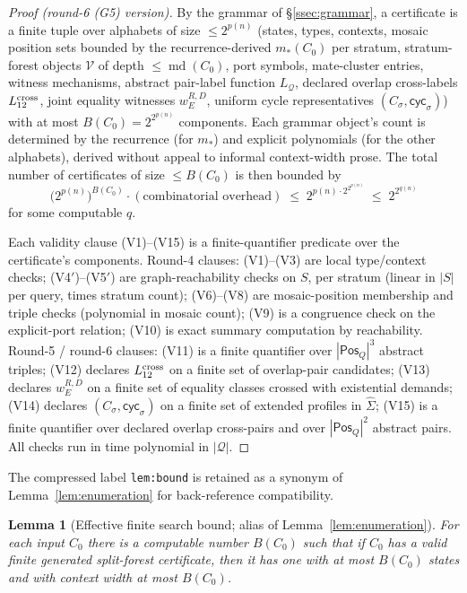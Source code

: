 \documentclass[11pt]{article}
\newtheorem{lemma}[theorem]{Lemma}
\newcommand{\Q}{\mathcal Q}
\newcommand{\Pos}{\mathsf{Pos}}
\newcommand{\extSigma}{\widehat\Sigma}
\newcommand{\md}{\operatorname{md}}
\begin{document}
\begin{proof}[Proof (round-6 (G5) version)]
By the grammar of \S\ref{ssec:grammar}, a certificate is a finite
tuple over alphabets of size $\le 2^{p(n)}$ (states, types,
contexts, mosaic position sets bounded by the recurrence-derived
$m_*(C_0)$ per stratum, stratum-forest objects $\mathcal V$ of
depth $\le\md(C_0)$, port symbols, mate-cluster entries, witness
mechanisms, abstract pair-label function $L_\Q$, declared overlap
cross-labels $L_{12}^{\rm cross}$, joint equality witnesses
$w_E^{R,D}$, uniform cycle representatives
$(C_\sigma,\mathsf{cyc}_\sigma)$) with at most $B(C_0)=2^{2^{p(n)}}$
components.  Each grammar object's count is determined by the
recurrence (for $m_*$) and explicit polynomials (for the other
alphabets), derived without appeal to informal context-width prose.
The total number of certificates of size $\le B(C_0)$ is then
bounded by
\[
  \bigl(2^{p(n)}\bigr)^{B(C_0)}\cdot(\text{combinatorial overhead})
  \;\le\; 2^{p(n)\cdot 2^{2^{p(n)}}}
  \;\le\; 2^{2^{q(n)}}
\]
for some computable $q$.

Each validity clause (V1)--(V15) is a finite-quantifier predicate
over the certificate's components.  Round-4 clauses: (V1)--(V3) are
local type/context checks; (V4$'$)--(V5$'$) are graph-reachability
checks on $S$, per stratum (linear in $|S|$ per query, times stratum
count); (V6)--(V8) are mosaic-position membership and triple checks
(polynomial in mosaic count); (V9) is a congruence check on the
explicit-port relation; (V10) is exact summary computation by
reachability.  Round-5 / round-6 clauses: (V11) is a finite
quantifier over $|\Pos_Q|^3$ abstract triples; (V12) declares
$L_{12}^{\rm cross}$ on a finite set of overlap-pair candidates;
(V13) declares $w_E^{R,D}$ on a finite set of equality classes
crossed with existential demands; (V14) declares
$(C_\sigma,\mathsf{cyc}_\sigma)$ on a finite set of extended
profiles in $\extSigma$; (V15) is a finite quantifier over declared
overlap cross-pairs and over $|\Pos_Q|^2$ abstract pairs.  All
checks run in time polynomial in $|\Q|$.
\end{proof}

The compressed label \texttt{lem:bound} is retained as a synonym
of Lemma~\ref{lem:enumeration} for back-reference compatibility.
\begin{lemma}[Effective finite search bound; alias of Lemma~\ref{lem:enumeration}]\label{lem:bound}
For each input $C_0$ there is a computable number $B(C_0)$ such that
if $C_0$ has a valid finite generated split-forest certificate, then
it has one with at most $B(C_0)$ states and with context width at
most $B(C_0)$.
\end{lemma}
\end{document}
